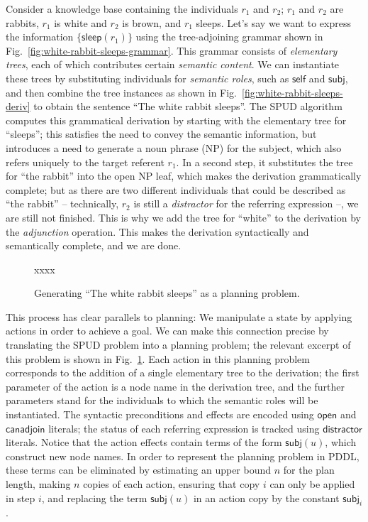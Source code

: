 Consider a knowledge base containing the individuals $r_1$ and $r_2$;
$r_1$ and $r_2$ are rabbits, $r_1$ is white and $r_2$ is brown, and
$r_1$ sleeps.  Let's say we want to express the information
$\{\mathsf{sleep}(r_1)\}$ using the tree-adjoining grammar shown in
Fig.~\ref{fig:white-rabbit-sleeps-grammar}.  This grammar consists of
\emph{elementary trees}, each of which contributes certain
\emph{semantic content}.  We can instantiate these trees by
substituting individuals for \emph{semantic roles}, such as
$\mathsf{self}$ and $\mathsf{subj}$, and then combine the tree
instances as shown in Fig.~\ref{fig:white-rabbit-sleeps-deriv} to
obtain the sentence ``The white rabbit sleeps''.  The SPUD algorithm
computes this grammatical derivation by starting with the elementary
tree for ``sleeps''; this satisfies the need to convey the semantic
information, but introduces a need to generate a noun phrase (NP) for
the subject, which also refers uniquely to the target referent $r_1$.
In a second step, it substitutes the tree for ``the rabbit'' into the
open NP leaf, which makes the derivation grammatically complete; but
as there are two different individuals that could be described as
``the rabbit'' -- technically, $r_2$ is still a \emph{distractor} for
the referring expression --, we are still not finished.  This is why
we add the tree for ``white'' to the derivation by the
\emph{adjunction} operation.  This makes the derivation syntactically
and semantically complete, and we are done.

\begin{figure}
  \centering
  xxxx
  \caption{Generating ``The white rabbit sleeps'' as a planning problem.}
  \label{fig:white-rabbit-as-planning}
\end{figure}

This process has clear parallels to planning: We manipulate a state by
applying actions in order to achieve a goal.  We can make this
connection precise by translating the SPUD problem into a planning
problem; the relevant excerpt of this problem is shown in
Fig.~\ref{fig:white-rabbit-as-planning}.  Each action in this planning
problem corresponds to the addition of a single elementary tree to the
derivation; the first parameter of the action is a node name in the
derivation tree, and the further parameters stand for the individuals
to which the semantic roles will be instantiated.  The syntactic
preconditions and effects are encoded using $\mathsf{open}$ and
$\mathsf{canadjoin}$ literals; the status of each referring expression
is tracked using $\mathsf{distractor}$ literals.  Notice that the
action effects contain terms of the form $\mathsf{subj}(u)$, which
construct new node names.  In order to represent the planning problem
in PDDL, these terms can be eliminated by estimating an upper bound
$n$ for the plan length, making $n$ copies of each action, ensuring
that copy $i$ can only be applied in step $i$, and replacing the term
$\mathsf{subj}(u)$ in an action copy by the constant
$\mathsf{subj}_i$.

